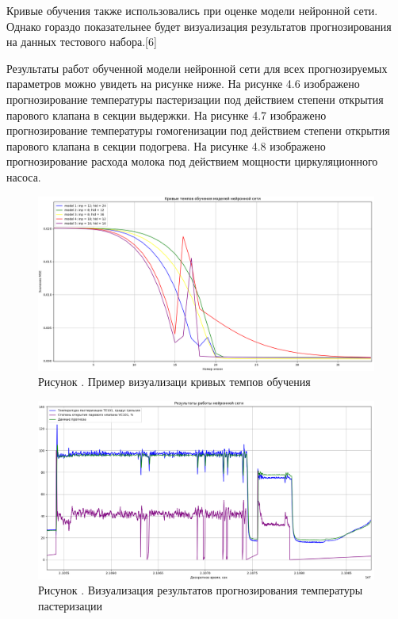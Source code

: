 {  \par \redline Кривые обучения также использовались при оценке модели нейронной сети. Однако гораздо показательнее будет визуализация результатов прогнозирования на данных тестового набора.[6]

  \par \redline Результаты работ обученной модели нейронной сети для всех прогнозируемых параметров можно увидеть на рисунке ниже. На рисунке 4.6 изображено прогнозирование температуры пастеризации под действием степени открытия парового клапана в секции выдержки. На рисунке 4.7 изображено прогнозирование температуры гомогенизации под действием степени открытия парового клапана в секции подогрева. На рисунке 4.8 изображено прогнозирование расхода молока под действием мощности циркуляционного насоса.  

  \begin{figure}
    \centering
    \def\svgwidth{\textwidth}
    \includegraphics[width=\textheight]{images/CTL.png}
    \caption*{\gostFont Рисунок \thechaptercntr .\theimagecntr \spc {--} Пример визуализаци кривых темпов обучения}
    \label{fig:CTL}
  \end{figure} \addtocounter{imagecntr}{1}

  \begin{figure}
    \centering
    \def\svgwidth{\textwidth}
    \includegraphics[width=\textheight]{images/TE101test.png}
    \caption*{\gostFont Рисунок \thechaptercntr .\theimagecntr \spc {--} Визуализация результатов прогнозирования температуры пастеризации}
    \label{fig:TE101VisualPredict}
  \end{figure} \addtocounter{imagecntr}{1}

}
